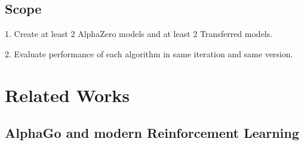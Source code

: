\documentclass[12pt,a4paper]{article}
\begin{document}
\subsection{Scope}
{
\hspace{0.6cm} 1. Create at least 2 AlphaZero models and at least 2 Transferred models.\par
\hspace{0cm} 2. Evaluate performance of each algorithm in same iteration and same version.
}
\clearpage

\section{Related Works}
\subsection{AlphaGo and modern Reinforcement Learning}
\end{document}
